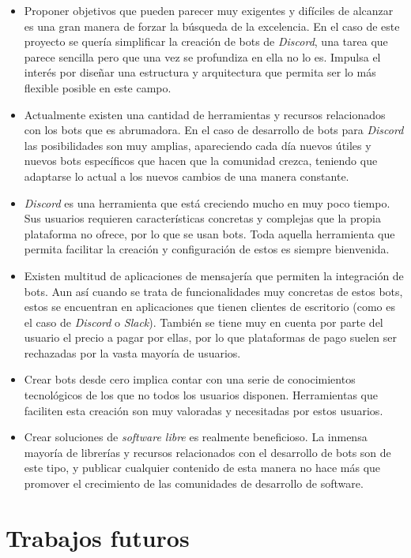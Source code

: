 \begin{itemize}
	\item Proponer objetivos que pueden parecer muy exigentes y difíciles de alcanzar es una gran manera de forzar la búsqueda de la excelencia. En el caso de este proyecto se quería simplificar la creación de bots de \textit{Discord}, una tarea que parece sencilla pero que una vez se profundiza en ella no lo es. Impulsa el interés por diseñar una estructura y arquitectura que permita ser lo más flexible posible en este campo.
	\item Actualmente existen una cantidad de herramientas y recursos relacionados con los bots que es abrumadora. En el caso de desarrollo de bots para \textit{Discord} las posibilidades son muy amplias, apareciendo cada día nuevos útiles y nuevos bots específicos que hacen que la comunidad crezca, teniendo que adaptarse lo actual a los nuevos cambios de una manera constante.
	\item \textit{Discord} es una herramienta que está creciendo mucho en muy poco tiempo. Sus usuarios requieren características concretas y complejas que la propia plataforma no ofrece, por lo que se usan bots. Toda aquella herramienta que permita facilitar la creación y configuración de estos es siempre bienvenida.
	\item Existen multitud de aplicaciones de mensajería que permiten la integración de bots. Aun así cuando se trata de funcionalidades muy concretas de estos bots, estos se encuentran en aplicaciones que tienen clientes de escritorio (como es el caso de \textit{Discord} o \textit{Slack}). También se tiene muy en cuenta por parte del usuario el precio a pagar por ellas, por lo que plataformas de pago suelen ser rechazadas por la vasta mayoría de usuarios.
	\item Crear bots desde cero implica contar con una serie de conocimientos tecnológicos de los que no todos los usuarios disponen. Herramientas que faciliten esta creación son muy valoradas y necesitadas por estos usuarios.
	\item Crear soluciones de \textit{software libre} es realmente beneficioso. La inmensa mayoría de librerías y recursos relacionados con el desarrollo de bots son de este tipo, y publicar cualquier contenido de esta manera no hace más que promover el crecimiento de las comunidades de desarrollo de software.
\end{itemize}





\section{Trabajos futuros}

